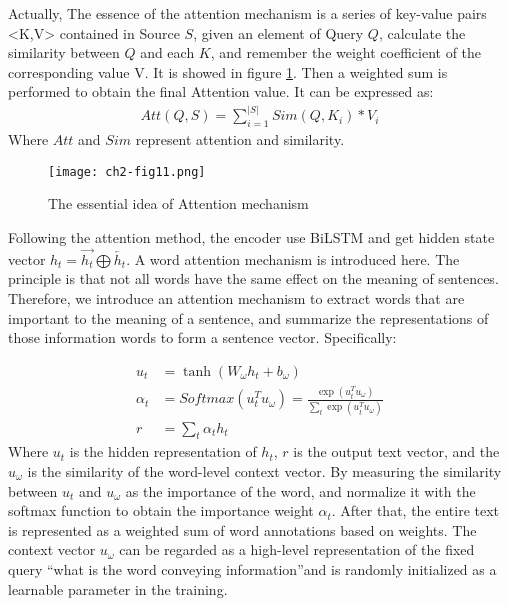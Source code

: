 Actually, The essence of the attention mechanism is a series of key-value pairs <K,V> contained in Source $S$, given an element of Query $Q$, calculate the similarity between $Q$ and each $K$, and remember the weight coefficient of the corresponding value V. It is showed in figure \ref{ch2-fig10}. Then a weighted sum is performed to obtain the final Attention value. It can be expressed as:
\begin{align}
	Att(Q,S) = \sum_{i=1}^{|S|}Sim(Q,K_i)*V_i
\end{align}
Where $Att$ and $Sim$ represent attention and similarity.

\begin{figure}[h]
	\centering
	\texttt{[image: ch2-fig11.png]}
	\caption{The essential idea of Attention mechanism}
	\label{ch2-fig10}
\end{figure}
Following the attention method, the encoder use BiLSTM and get hidden state vector $h_t=\overrightarrow{h_t}\bigoplus \overleftarrow{h_t}$. A word attention mechanism is introduced here. The principle is that not all words have the same effect on the meaning of sentences. Therefore, we introduce an attention mechanism to extract words that are important to the meaning of a sentence, and summarize the representations of those information words to form a sentence vector.
Specifically:



\begin{align}
	u_t      & = \tanh(W_\omega h_t + b_\omega )                                                    \\
	\alpha_t & =Softmax(u_t^T u_\omega) = \frac{\exp( u_t^T u_\omega)}{\sum_t \exp(u_t^T u_\omega)} \\
	r        & = \sum_t{\alpha_t h_t}
\end{align}
Where $u_t$ is the hidden representation of \(h_t\), \(r\) is the output text vector, and the \(u_\omega\) is the similarity of the word-level context vector. By measuring the similarity between \(u_t\) and \(u_\omega\) as the importance of the word, and normalize it with the softmax function to obtain the importance weight \(\alpha_{t}\). After that, the entire text is represented as a weighted sum of word annotations based on weights. The context vector \(u_\omega \) can be regarded as a high-level representation of the fixed query ``what is the word conveying information''and is randomly initialized as a learnable parameter in the training.

